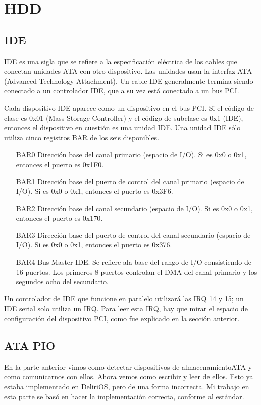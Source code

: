 \newpage

\section{HDD}

\subsection{IDE}
IDE es una sigla que se refiere a la especificación eléctrica de los cables que conectan unidades ATA con otro dispositivo. Las unidades usan la interfaz ATA (Advanced Technology Attachment). Un cable IDE generalmente termina siendo conectado a un controlador IDE, que a su vez está conectado a un bus PCI.

Cada dispositivo IDE aparece como un dispositivo en el bus PCI. Si el código de clase es 0x01 (Mass Storage Controller) y el código de subclase es 0x1 (IDE), entonces el dispositivo en cuestión es una unidad IDE. Una unidad IDE sólo utiliza cinco registros BAR de los seis disponibles.

\begin{enumerate}
 \item[BAR0] Dirección base del canal primario (espacio de I/O). Si es 0x0 o 0x1, entonces el puerto es 0x1F0.
 \item[BAR1] Dirección base del puerto de control del canal primario (espacio de I/O). Si es 0x0 o 0x1, entonces el puerto es 0x3F6.
 \item[BAR2] Dirección base del canal secundario (espacio de I/O). Si es 0x0 o 0x1, entonces el puerto es 0x170.
 \item[BAR3] Dirección base del puerto de control del canal secundario (espacio de I/O). Si es 0x0 o 0x1, entonces el puerto es 0x376.
 \item[BAR4] Bus Master IDE. Se refiere ala base del rango de I/O consistiendo de 16 puertos. Los primeros 8 puertos controlan el DMA del canal primario y los segundos ocho del secundario.
\end{enumerate}

Un controlador de IDE que funcione en paralelo utilizará las IRQ 14 y 15; un IDE serial solo utiliza un IRQ. Para leer esta IRQ, hay que mirar el espacio de configuración del dispositivo PCI, como fue explicado en la sección anterior.

\subsection{ATA PIO}
En la parte anterior vimos como detectar dispositivos de almacenamientoATA y como comunicarnos con ellos. Ahora vemos como escribir y leer de ellos. Esto ya estaba implementado en DeliriOS, pero de una forma incorrecta. Mi trabajo en esta parte se basó en hacer la implementación correcta, conforme al estándar.

